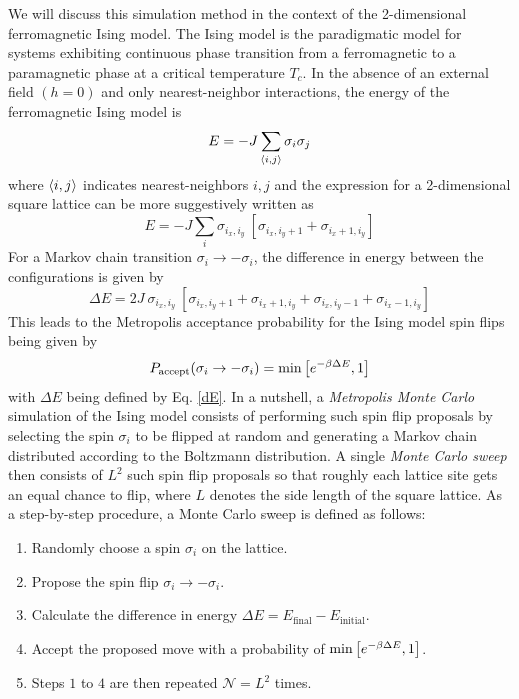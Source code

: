 \documentclass[../thesis_main.tex]{subfiles}
\begin{document}
We will discuss this simulation method in the context of the 2-dimensional ferromagnetic Ising model. The Ising model is the paradigmatic model for systems exhibiting continuous phase transition from a ferromagnetic to a paramagnetic phase at a critical temperature $T_c$. In the absence of an external field $(h=0)$ and only nearest-neighbor interactions, the energy of the ferromagnetic Ising model is 
\begin{equation}
    E = -J \sum_{\expval{i, j}} \sigma_i \sigma_j
    \label{ising}
\end{equation}
where $\expval{i, j}$ indicates nearest-neighbors $i, j$ and the expression for a 2-dimensional square lattice can be more suggestively written as 
\begin{equation}
    E  = -J \sum_{i} \sigma_{i_x, i_y}  \: [\sigma_{i_x, i_y + 1} + \sigma_{i_x + 1, i_y}]
\end{equation}   
For a Markov chain transition $\sigma_i \to - \sigma_i$, the difference in energy between the configurations is given by 
\begin{equation}
    \Delta E = 2J \: \sigma_{i_x, i_y} \: [\sigma_{i_x, i_y + 1} + \sigma_{i_x + 1, i_y} + \sigma_{i_x, i_y - 1} + \sigma_{i_x - 1 , i_y}]
    \label{dE}
\end{equation}
This leads to the Metropolis acceptance probability for the Ising model spin flips being given by
\begin{equation}
    P_\text{accept}(\sigma_i \to -\sigma_i) = \min \qty[e^{-\beta \Delta E}, 1]
    \label{metropolis_ising}
\end{equation}
with $\Delta E$ being defined by Eq. \eqref{dE}. In a nutshell, a \textit{Metropolis Monte Carlo} simulation of the Ising model consists of performing such spin flip proposals by selecting the spin $\sigma_i$ to be flipped at random and generating a Markov chain distributed according to the Boltzmann distribution. A single \textit{Monte Carlo sweep} then consists of $L^2$ such spin flip proposals so that roughly each lattice site gets an equal chance to flip, where $L$ denotes the side length of the square lattice. As a step-by-step procedure, a Monte Carlo sweep is defined as follows:
\begin{enumerate}
    \setlength\itemsep{0.3em}
    \item Randomly choose a spin $\sigma_i$ on the lattice.
    \item Propose the spin flip $\sigma_i \to - \sigma_i$.
    \item Calculate the difference in energy $\Delta E = E_\text{final} - E_\text{initial}$.
    \item Accept the proposed move with a probability of $\min \qty[e^{-\beta \Delta E}, 1]$.
    \item Steps $1$ to $4$ are then repeated $\mathcal{N} = L^2$ times.       
\end{enumerate}
\end{document}
